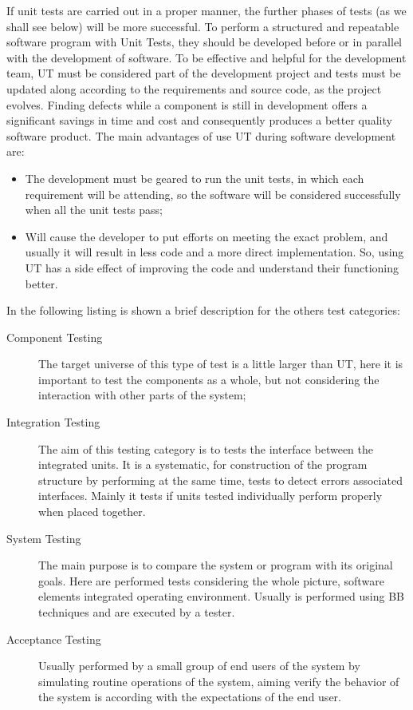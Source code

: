 {If unit tests are carried out in a proper manner, the further phases of tests (as we shall see below) will be more successful.
To perform a structured and repeatable software program with Unit Tests, they should be developed before or in parallel with the development of software.
To be effective and helpful for the development team, \ac{UT} must be considered part of the development project
and tests must be updated along according to the requirements and source code, as the project evolves\cite{dustin2002effective}.
Finding defects while a component is still in development offers a significant savings in time and cost and consequently produces a better quality software product.
The main advantages of use \ac{UT} during software development are\cite{dustin2002effective}:
\begin{itemize}
\item The development must be geared to run the unit tests, in which each requirement will be attending, so the software will be considered
successfully when all the unit tests pass;
\item Will cause the developer to put efforts on meeting the exact problem, and usually it will result in less code and a more direct implementation.
So, using \ac{UT} has a side effect of improving the code and understand their functioning better.
\end{itemize}

In the following listing is shown a brief description for the others test categories:

\begin{description}
\item[Component Testing] The target universe of this type of test is a little larger than \ac{UT},
here it is important to test the components as a whole, but not considering the interaction with other parts of the system;
\item[Integration Testing] The aim of this testing category is to tests the interface between the integrated units.
It is a systematic, for construction of the program structure by performing at the same time, tests to detect errors associated interfaces.
Mainly it tests if units tested individually perform properly when placed together.
\item[System Testing]
The main purpose is to compare the system or program with its original goals.
Here are performed tests considering the whole picture, software elements integrated operating environment.
Usually is performed using \ac{BB} techniques and are executed by a tester.
\item[Acceptance Testing] Usually performed by a small group of end users of the system by simulating routine operations of the system, aiming
verify the behavior of the system is according with the expectations of the end user.
\end{description}

}
